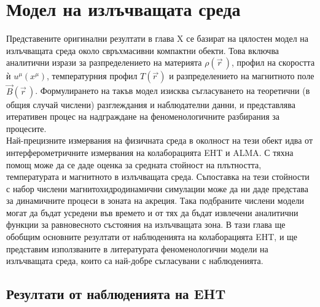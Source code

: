 \section{Модел на излъчващата среда}
\lfoot{}

Представените оригинални резултати в глава {\color{red}X} се базират на цялостен модел на излъчващата среда около свръхмасивни компактни обекти. Това включва аналитични изрази за разпределението на материята $\rho(\vec{r}\,)$, профил на скоростта ѝ $u^\mu (x^\mu)$, температурния профил $T(\vec{r\,})$ и разпределението на магнитното поле $\vec{B}(\vec{r}\,)$. Формулирането на такъв модел изисква съгласуването на теоретични (в общия случай числени) разглеждания и наблюдателни данни, и представлява итеративен процес на надграждане на феноменологичните разбирания за процесите.\\

Най-прецизните измервания на физичната среда в околност на тези обект идва от интерферометричните измервания на колаборацията EHT и ALMA. С тяхна помощ може да се даде оценка за средната стойност на плътността, температурата и магнитното в излъчващата среда. Съпоставка на тези стойности с набор числени магнитохидродинамични симулации може да ни даде представа за динамичните процеси в зоната на акреция. Така подбраните числени модели могат да бъдат усредени във времето и от тях да бъдат извлечени аналитични функции за равновесното състояния на излъчващата зона. В тази глава ще обобщим основните резултати от наблюденията на колаборацията EHT, и ще представим използваните в литературата феноменологични модели на излъчващата среда, които са най-добре съгласувани с наблюденията. 


\subsection{Резултати от наблюденията на EHT}

